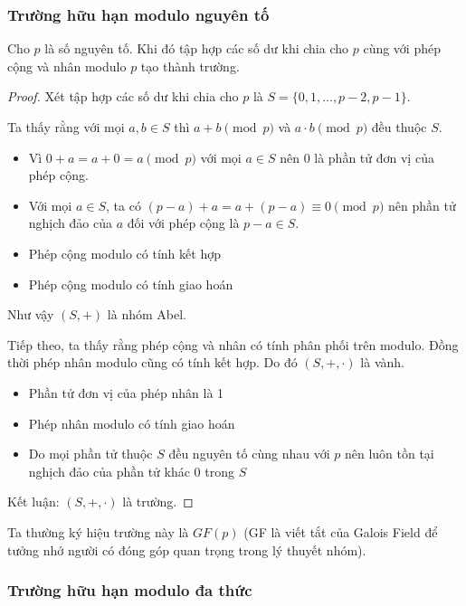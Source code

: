 \subsubsection*{Trường hữu hạn modulo nguyên tố}

Cho $p$ là số nguyên tố. Khi đó tập hợp các số dư khi chia cho $p$ cùng với phép cộng và nhân modulo $p$ tạo thành trường.

\begin{proof}
    Xét tập hợp các số dư khi chia cho $p$ là $S = \{0, 1, \ldots, p-2, p-1\}$.

    Ta thấy rằng với mọi $a, b \in S$ thì $a + b \pmod p$ và $a \cdot b \pmod p$ đều thuộc $S$.

    \begin{itemize}
        \item Vì $0 + a = a + 0 = a \pmod p$ với mọi $a \in S$ nên $0$ là phần tử đơn vị của phép cộng.
        \item Với mọi $a \in S$, ta có $(p-a) + a = a + (p-a) \equiv 0 \pmod p$ nên phần tử nghịch đảo của $a$ 
        đối với phép cộng là $p-a \in S$.
        \item Phép cộng modulo có tính kết hợp
        \item Phép cộng modulo có tính giao hoán
    \end{itemize}
    Như vậy $(S, +)$ là nhóm Abel.

    Tiếp theo, ta thấy rằng phép cộng và nhân có tính phân phối trên modulo.
    Đồng thời phép nhân modulo cũng có tính kết hợp. Do đó $(S, +, \cdot)$ là vành.

    \begin{itemize}
        \item Phần tử đơn vị của phép nhân là 1
        \item Phép nhân modulo có tính giao hoán
        \item Do mọi phần tử thuộc $S$ đều nguyên tố cùng nhau với $p$ nên luôn tồn tại nghịch đảo của phần tử khác 0 trong $S$
    \end{itemize}
    Kết luận: $(S, +, \cdot)$ là trường.
\end{proof}

Ta thường ký hiệu trường này là $GF(p)$ (GF là viết tắt của Galois Field để tưởng nhớ người có đóng góp quan trọng trong lý thuyết nhóm).

\subsubsection*{Trường hữu hạn modulo đa thức}

